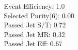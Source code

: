 Event Efficiency:   1.0\\ 
Selected Purity(6): 0.00\\ 
Passed Jet S/T:     0.72\\ 
Passed Jet MR:      0.32\\ 
Passed Jet Eff:     0.67